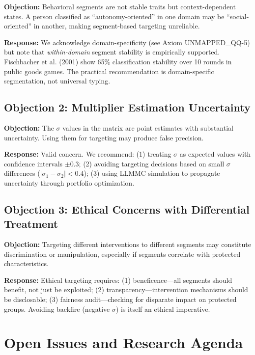 \textbf{Objection:} Behavioral segments are not stable traits but context-dependent
states. A person classified as ``autonomy-oriented'' in one domain may be
``social-oriented'' in another, making segment-based targeting unreliable.

\textbf{Response:} We acknowledge domain-specificity (see Axiom UNMAPPED_QQ-5) but note that
\textit{within-domain} segment stability is empirically supported. Fischbacher et al.
(2001) show 65\% classification stability over 10 rounds in public goods games.
The practical recommendation is domain-specific segmentation, not universal typing.

\subsection{Objection 2: Multiplier Estimation Uncertainty}

\textbf{Objection:} The $\sigma$ values in the matrix are point estimates with
substantial uncertainty. Using them for targeting may produce false precision.

\textbf{Response:} Valid concern. We recommend: (1) treating $\sigma$ as expected
values with confidence intervals $\pm 0.3$; (2) avoiding targeting decisions based
on small $\sigma$ differences ($|\sigma_1 - \sigma_2| < 0.4$); (3) using LLMMC
simulation to propagate uncertainty through portfolio optimization.

\subsection{Objection 3: Ethical Concerns with Differential Treatment}

\textbf{Objection:} Targeting different interventions to different segments may
constitute discrimination or manipulation, especially if segments correlate with
protected characteristics.

\textbf{Response:} Ethical targeting requires: (1) beneficence---all segments should
benefit, not just be exploited; (2) transparency---intervention mechanisms should
be disclosable; (3) fairness audit---checking for disparate impact on protected
groups. Avoiding backfire (negative $\sigma$) is itself an ethical imperative.


\section{Open Issues and Research Agenda}
\label{sec:qq-open}

